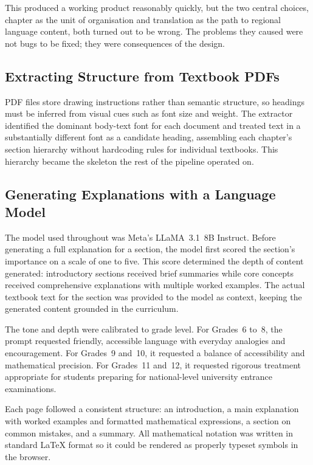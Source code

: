 \documentclass[12pt,a4paper]{article}
\begin{document}
This produced a working product reasonably quickly,
but the two central choices, chapter as the unit of organisation
    and translation as the path to regional language content, both turned out to be wrong.
The problems they caused were not bugs to be fixed; they were consequences of the design.

\subsection{Extracting Structure from Textbook PDFs}

PDF files store drawing instructions rather than semantic structure, so headings must be
inferred from visual cues such as font size and weight.
The extractor identified the dominant body-text font for each document and treated text
in a substantially different font as a candidate heading, assembling each chapter's
section hierarchy without hardcoding rules for individual textbooks.
This hierarchy became the skeleton the rest of the pipeline operated on.

\subsection{Generating Explanations with a Language Model}


The model used throughout was Meta's LLaMA~3.1~8B Instruct. Before generating a full explanation for a section,
the model first scored the section's importance on a scale of one to five.
This score determined the depth of content generated:
introductory sections received brief summaries while core concepts
received comprehensive explanations with multiple worked examples.
The actual textbook text for the section was provided to the model as context,
keeping the generated content grounded in the curriculum.

The tone and depth were calibrated to grade level.
For Grades~6 to~8, the prompt requested friendly, accessible language with everyday
analogies and encouragement.
For Grades~9 and~10, it requested a balance of accessibility and mathematical precision.
For Grades~11 and~12, it requested rigorous treatment appropriate for students
preparing for national-level university entrance examinations.

Each page followed a consistent structure: an introduction, a main explanation with
worked examples and formatted mathematical expressions, a section on common mistakes,
and a summary.
All mathematical notation was written in standard \LaTeX{} format so it could be rendered
as properly typeset symbols in the browser.
\end{document}
